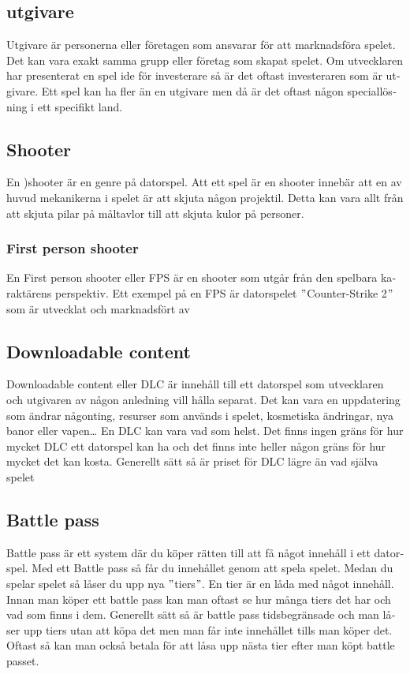 \documentclass[11p]{article}
\begin{document}
\begin{otherlanguage}{swedish}
    \subsection{utgivare}
    Utgivare är personerna eller företagen som ansvarar för att marknadsföra spelet.
    Det kan vara exakt samma grupp eller företag som skapat spelet.
    Om utvecklaren har presenterat en spel ide för investerare så är det oftast investeraren som är utgivare.
    Ett spel kan ha fler än en utgivare men då är det oftast någon speciallösning i ett specifikt land.

    \subsection{Shooter}
    En )shooter är en genre på datorspel.
    Att ett spel är en shooter innebär att en av huvud mekanikerna i spelet är att skjuta någon projektil.
    Detta kan vara allt från att skjuta pilar på måltavlor till att skjuta kulor på personer.

    \subsubsection{First person shooter}
    En First person shooter eller FPS är en shooter som utgår från den spelbara karaktärens perspektiv.
    Ett exempel på en FPS är datorspelet \("\)Counter-Strike 2\("\) som är utvecklat och marknadsfört av \textcite{CounterStrike}

    \subsection{Downloadable content}
    Downloadable content eller DLC är innehåll till ett datorspel som utvecklaren och utgivaren av någon anledning vill hålla separat.
    Det kan vara en uppdatering som ändrar någonting, resurser som används i spelet, kosmetiska ändringar, nya banor eller vapen\ldots
    En DLC kan vara vad som helst.
    Det finns ingen gräns för hur mycket DLC ett datorspel kan ha och det finns inte heller någon gräns för hur mycket det kan kosta.
    Generellt sätt så är priset för DLC lägre än vad själva spelet
    \subsection{Battle pass}
    Battle pass är ett system där du köper rätten till att få något innehåll i ett datorspel.
    Med ett Battle pass så får du innehållet genom att spela spelet.
    Medan du spelar spelet så låser du upp nya \("\)tiers\("\).
    En tier är en låda med något innehåll.
    Innan man köper ett battle pass kan man oftast se hur många tiers det har och vad som finns i dem.
    Generellt sätt så är battle pass tidsbegränsade och man låser upp tiers utan att köpa det men man får inte innehållet tills man köper det.
    Oftast så kan man också betala för att låsa upp nästa tier efter man köpt battle passet.


\end{otherlanguage}
\end{document}
